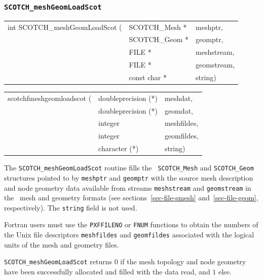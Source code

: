 \subsubsection{{\tt SCOTCH\_meshGeomLoadScot}}

\begin{itemize}
\progsyn

{\tt\begin{tabular}{l@{}ll}
int SCOTCH\_meshGeomLoadScot ( & SCOTCH\_Mesh * & meshptr, \\
                               & SCOTCH\_Geom * & geomptr, \\
                               & FILE *         & meshstream, \\
                               & FILE *         & geomstream, \\
                               & const char *   & string)
\end{tabular}}

{\tt\begin{tabular}{l@{}ll}
scotchfmeshgeomloadscot ( & doubleprecision (*) & meshdat, \\
                          & doubleprecision (*) & geomdat, \\
                          & integer             & meshfildes, \\
                          & integer             & geomfildes, \\
                          & character (*)       & string)
\end{tabular}}

\progdes

The {\tt SCOTCH\_meshGeomLoadScot} routine fills the {\tt
SCOTCH\_\lbt Mesh} and {\tt SCOTCH\_\lbt Geom} structures pointed to
by {\tt meshptr} and {\tt geomptr} with the source mesh description
and node geometry data available from streams {\tt mesh\lbt stream}
and {\tt geom\lbt stream} in the \scotch\ mesh and geometry formats
(see sections~\ref{sec-file-smesh} and~\ref{sec-file-geom},
respectively). The {\tt string} field is not used.

Fortran users must use the {\tt PXFFILENO} or {\tt FNUM} functions to
obtain the numbers of the Unix file descriptors {\tt mesh\lbt fildes}
and {\tt geom\lbt fildes} associated with the logical units of the
mesh and geometry files.

\progret

{\tt SCOTCH\_meshGeomLoadScot} returns $0$ if the mesh topology and
node geometry have been successfully allocated and filled with the
data read, and $1$ else.
\end{itemize}

